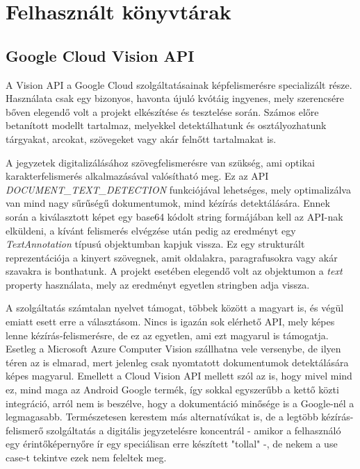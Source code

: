 \chapter{Felhasznált könyvtárak}

\section{Google Cloud Vision API}

A Vision API a Google Cloud szolgáltatásainak képfelismerésre specializált része. Használata csak egy bizonyos, havonta újuló kvótáig ingyenes, mely szerencsére bőven elegendő volt a projekt elkészítése és tesztelése során. Számos előre betanított modellt tartalmaz, melyekkel detektálhatunk és osztályozhatunk tárgyakat, arcokat, szövegeket vagy akár felnőtt tartalmakat is. \cite{Vision}

A jegyzetek digitalizálásához szövegfelismerésre van szükség, ami optikai karakterfelismerés alkalmazásával valósítható meg. Ez az API \emph{DOCUMENT\_TEXT\_DETECTION} funkciójával lehetséges, mely optimalizálva van mind nagy sűrűségű dokumentumok, mind kézírás detektálására. Ennek során a kiválasztott képet egy base64 kódolt string formájában kell az API-nak elküldeni, a kívánt felismerés elvégzése után pedig az eredményt egy \emph{TextAnnotation} típusú objektumban kapjuk vissza. Ez egy strukturált reprezentációja a kinyert szövegnek, amit oldalakra, paragrafusokra vagy akár szavakra is bonthatunk. A projekt esetében elegendő volt az objektumon a \emph{text} property használata, mely az eredményt egyetlen stringben adja vissza.

A szolgáltatás számtalan nyelvet támogat, többek között a magyart is, és végül emiatt esett erre a választásom. Nincs is igazán sok elérhető API, mely képes lenne kézírás-felismerésre, de ez az egyetlen, ami ezt magyarul is támogatja. Esetleg a Microsoft Azure Computer Vision szállhatna vele versenybe, de ilyen téren az is elmarad, mert jelenleg csak nyomtatott dokumentumok detektálására képes magyarul. Emellett a Cloud Vision API mellett szól az is, hogy mivel mind ez, mind maga az Android Google termék, így sokkal egyszerűbb a kettő közti integráció, arról nem is beszélve, hogy a dokumentáció minősége is a Google-nél a legmagasabb. Természetesen kerestem más alternatívákat is, de a legtöbb kézírás-felismerő szolgáltatás a digitális jegyzetelésre koncentrál - amikor a felhasználó egy érintőképernyőre ír egy speciálisan erre készített "tollal" -, de nekem a use case-t tekintve ezek nem feleltek meg.

